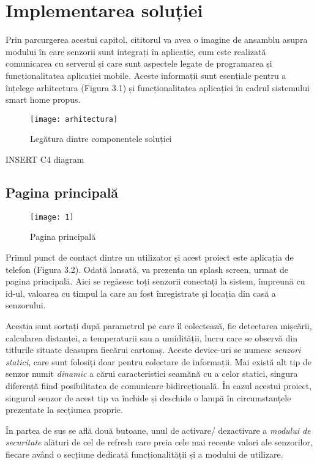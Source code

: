 \chapter{Implementarea soluției}

Prin parcurgerea acestui capitol, cititorul va avea o imagine de ansamblu asupra modului în care senzorii sunt integrați în aplicație, cum este realizată comunicarea cu serverul și care sunt aspectele legate de programarea și funcționalitatea aplicației mobile. Aceste informații sunt esențiale pentru a înțelege arhitectura (Figura 3.1) și funcționalitatea aplicației în cadrul sistemului smart home propus.

\begin{figure}[h]
	\centering
	\texttt{[image: arhitectura]}
	\caption{Legătura dintre componentele soluției}
	\label{fig:arhitectura}
\end{figure}

INSERT C4 diagram

\section{Pagina principală}

\begin{wrapfigure}{r}{0.4\textwidth}
	\texttt{[image: 1]}
	\caption{Pagina principală}
	\label{fig:1}
\end{wrapfigure}

Primul punct de contact dintre un utilizator și acest proiect este aplicația de telefon (Figura 3.2). Odată lansată, va prezenta un splash screen, urmat de pagina principală. Aici se regăsesc toți senzorii conectați la sistem, împreună cu id-ul, valoarea cu timpul la care au fost înregistrate și locația din casă a senzorului. 

Aceștia sunt sortați după parametrul pe care îl colectează, fie detectarea mișcării, calcularea distanței, a temperaturii sau a umidității, lucru care se observă din titlurile situate deasupra fiecărui cartonaș. Aceste device-uri se numesc \emph{senzori statici}, care sunt folosiți doar pentru colectare de informații. Mai există alt tip de senzor numit \emph{dinamic} a cărui caracteristici seamănă cu a celor statici, singura diferență fiind posibilitatea de comunicare bidirecțională. În cazul acestui proiect, singurul senzor de acest tip va închide și deschide o lampă în circumstanțele prezentate la secțiunea proprie.

În partea de sus se află două butoane, unul de activare/ dezactivare a \emph{modului de securitate} alături de cel de refresh care preia cele mai recente valori ale senzorilor, fiecare având o secțiune dedicată funcționalității și a modului de utilizare.

